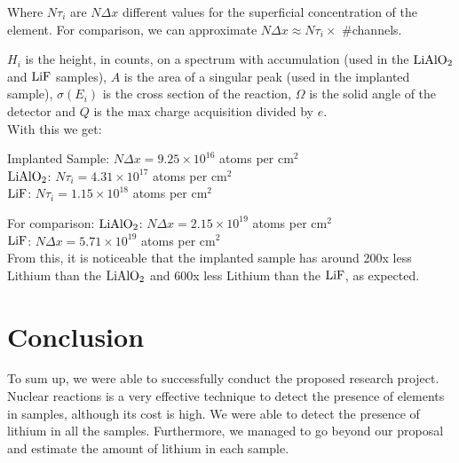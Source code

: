 \documentclass{article}
\begin{document}
\begin{multicols}{2}
\vspace{4mm}

Where $N\tau_i$ are $N\Delta x$ different values for the superficial concentration of the element. For comparison, we can approximate $N\Delta x \approx N\tau_i \times$ \#channels.

$H_i$ is the height, in counts, on a spectrum with accumulation (used in the $\ce{LiAlO2}$ and $\ce{LiF}$ samples), $A$ is the area of a singular peak (used in the implanted sample), $\sigma (E_i) $ is the cross section of the reaction, $\Omega$ is the solid angle of the detector and $Q$ is the max charge acquisition divided by $e$.\\

With this we get:

Implanted Sample: $N\Delta x = 9.25\times 10^{16}$ atoms per cm$^2$\\
$\ce{LiAlO2}$: $N\tau_i=4.31\times10^{17}$ atoms per cm$^2$\\
$\ce{LiF}$: $N\tau_i=1.15\times10^{18}$ atoms per cm$^2$

For comparison:
$\ce{LiAlO2}$: $N\Delta x=2.15\times10^{19}$ atoms per cm$^2$\\
$\ce{LiF}$: $N\Delta x=5.71\times10^{19}$ atoms per cm$^2$\\

From this, it is noticeable that the implanted sample has around 200x less Lithium than the $\ce{LiAlO2}$ and 600x less Lithium than the $\ce{LiF}$, as expected.

\section{Conclusion}
    \label{sec:conclusion}

To sum up, we were able to successfully conduct the proposed research project.
Nuclear reactions is a very effective technique to detect the presence of elements in samples, although its cost is high.
We were able to detect the presence of lithium in all the samples. 
Furthermore, we managed to go beyond our proposal and estimate the amount of lithium in each sample.

\printbibliography
\nocite{*}

\end{multicols}
\end{document}
